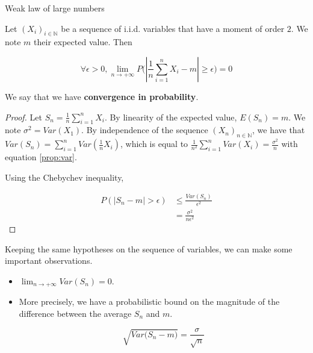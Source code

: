 \documentclass[
10pt, %
a4paper, %
oneside, %
headinclude,footinclude, %
BCOR5mm, %
]{scrartcl}
\begin{document}
\begin{theorem}{Weak law of large numbers}

    Let $(X_i)_{i\in \mathbb{N} }$ be a sequence of i.i.d. variables that have a moment of order $2$. We note $m$ their expected value. Then

    \begin{equation}
	\forall \epsilon > 0, \lim_{n\rightarrow+\infty}P\big( |\frac{1}{n} \sum^{n}_{i=1} X_i-m|\geq \epsilon \big)= 0
    \end{equation}

We say that we have \textbf{{convergence in probability}}.
\end{theorem}

\begin{proof}

    Let $S_n= \frac{1}{n} \sum^{n}_{i=1} X_i$. By linearity of the expected value, $E(S_n)=m$. We note $\sigma^2=Var(X_1)$. By independence of the sequence $(X_n)_{n\in \mathbb{N} }$, we have that $Var(S_n)= \sum^{n}_{i=1} Var( \frac{1}{n}  X_i)$, which is equal to $ \frac{1}{n^2} \sum^{n}_{i=1} Var(X_i)= \frac{\sigma^2}{n} $ with equation \ref{prop:var}.

    Using the Chebychev inequality, 

    \begin{equation*}
        \begin{aligned}
	    P(|S_n-m|>\epsilon) &\leq \frac{Var(S_n)}{\epsilon^2} \\
	    &= \frac{\sigma^2}{n\epsilon^2} 
        \end{aligned}
    \end{equation*}
    
\end{proof}

\begin{remark}
    Keeping the same hypotheses on the sequence of variables, we can make some important observations.
    \begin{itemize}
	\item $\lim_{n\rightarrow +\infty}Var(S_n)=0$.
	\item More precisely, we have a probabilistic bound on the magnitude of the difference between the average $S_n$ and $m$.

	    \begin{equation}
		\sqrt{Var\Big( S_n-m \Big)} = \frac{\sigma}{ \sqrt{n} } 
	    \end{equation}
    \end{itemize}
\end{remark}
\end{document}
